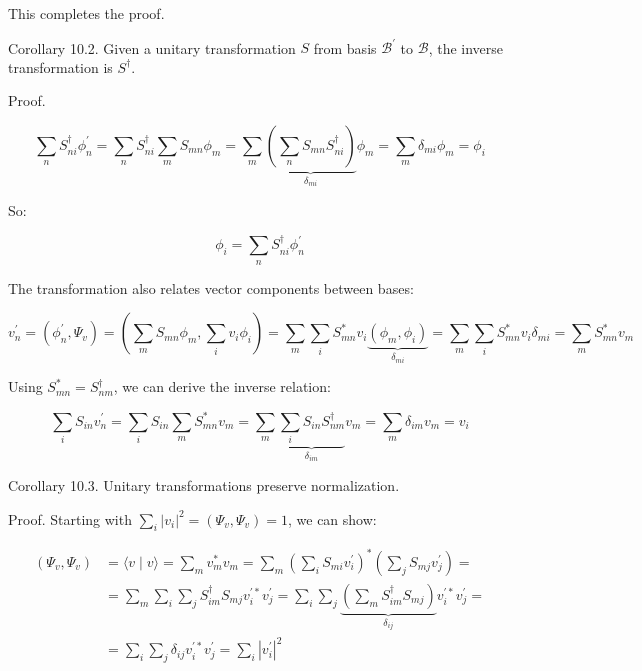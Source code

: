 This completes the proof.

Corollary 10.2. Given a unitary transformation $S$ from basis $\mathcal{B}^{\prime}$ to $\mathcal{B}$, the inverse transformation is $S^{\dagger}$.

Proof.

\begin{equation}
\sum_{n} S_{n i}^{\dagger} \phi_{n}^{\prime}=\sum_{n} S_{n i}^{\dagger} \sum_{m} S_{m n} \phi_{m}=\sum_{m} \underbrace{\left(\sum_{n} S_{m n} S_{n i}^{\dagger}\right)}_{\delta_{m i}} \phi_{m}=\sum_{m} \delta_{m i} \phi_{m}=\phi_{i}
\end{equation}


So:

\begin{equation}
\phi_{i}=\sum_{n} S_{n i}^{\dagger} \phi_{n}^{\prime}
\end{equation}

The transformation also relates vector components between bases:

\begin{equation}
v_{n}^{\prime}=\left(\phi_{n}^{\prime}, \Psi_{v}\right)=\left(\sum_{m} S_{m n} \phi_{m}, \sum_{i} v_{i} \phi_{i}\right)=\sum_{m} \sum_{i} S_{m n}^{*} v_{i} \underbrace{\left(\phi_{m}, \phi_{i}\right)}_{\delta_{m i}}=\sum_{m} \sum_{i} S_{m n}^{*} v_{i} \delta_{m i}=\sum_{m} S_{m n}^{*} v_{m}
\end{equation}

Using $S_{m n}^{*}=S_{n m}^{\dagger}$, we can derive the inverse relation:

\begin{equation}
\sum_{i} S_{i n} v_{n}^{\prime}=\sum_{i} S_{i n} \sum_{m} S_{m n}^{*} v_{m}=\sum_{m} \underbrace{\sum_{i} S_{i n} S_{n m}^{\dagger}}_{\delta_{i m}} v_{m}=\sum_{m} \delta_{i m} v_{m}=v_{i}
\end{equation}

Corollary 10.3. Unitary transformations preserve normalization.

Proof. Starting with $\sum_{i}\left|v_{i}\right|^{2}=\left(\Psi_{v}, \Psi_{v}\right)=1$, we can show:

\begin{align}
\left(\Psi_{v}, \Psi_{v}\right) & =\langle v \mid v\rangle=\sum_{m} v_{m}^{*} v_{m}=\sum_{m}\left(\sum_{i} S_{m i} v_{i}^{\prime}\right)^{*}\left(\sum_{j} S_{m j} v_{j}^{\prime}\right)= \\
& =\sum_{m} \sum_{i} \sum_{j} S_{i m}^{\dagger} S_{m j} v_{i}^{\prime*} v_{j}^{\prime}=\sum_{i} \sum_{j} \underbrace{\left(\sum_{m} S_{i m}^{\dagger} S_{m j}\right)}_{\delta_{i j}} v_{i}^{\prime*} v_{j}^{\prime}=  \\
& =\sum_{i} \sum_{j} \delta_{i j} v_{i}^{\prime*} v_{j}^{\prime}=\sum_{i}\left|v_{i}^{\prime}\right|^{2}
\end{align}

